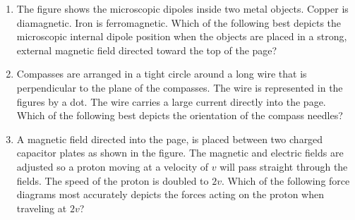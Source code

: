 \documentclass{../../oss-apphys}
\begin{document}
\begin{multicols}{2}
\begin{enumerate}[leftmargin=18pt]
    \columnbreak

  \item The figure shows the microscopic dipoles inside two metal objects.
    Copper is diamagnetic. Iron is ferromagnetic. Which of the following best
    depicts the microscopic internal dipole position when the objects are
    placed in a strong, external magnetic field directed toward the top of the
    page?
  
  \item Compasses are arranged in a tight circle around a long wire that is
    perpendicular to the plane of the compasses. The wire is represented in
    the figures by a dot. The wire carries a large current directly into the
    page. Which of the following best depicts the orientation of the compass
    needles?
    
  
    \columnbreak

  \item A magnetic field directed into the page, is placed between two charged
    capacitor plates as shown in the figure. The magnetic and electric fields
    are adjusted so a proton moving at a velocity of $v$ will pass straight
    through the fields. The speed of the proton is doubled to $2v$. Which of
    the following force diagrams most accurately depicts the forces acting on
    the proton when traveling at $2v$?
    \begin{center}
    \end{center}
    

\end{enumerate}
\end{multicols}
\end{document}
